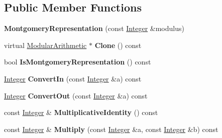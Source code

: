 \subsection*{Public Member Functions}
\begin{DoxyCompactItemize}
\item 
\hypertarget{class_montgomery_representation_ac65a390ac18c44b685a189047a4d3292}{
{\bfseries MontgomeryRepresentation} (const \hyperlink{class_integer}{Integer} \&modulus)}
\label{class_montgomery_representation_ac65a390ac18c44b685a189047a4d3292}

\item 
\hypertarget{class_montgomery_representation_a7a051242207625c219a03029365c4936}{
virtual \hyperlink{class_modular_arithmetic}{ModularArithmetic} $\ast$ {\bfseries Clone} () const }
\label{class_montgomery_representation_a7a051242207625c219a03029365c4936}

\item 
\hypertarget{class_montgomery_representation_a47ca2277410a94e93ab6aea778269047}{
bool {\bfseries IsMontgomeryRepresentation} () const }
\label{class_montgomery_representation_a47ca2277410a94e93ab6aea778269047}

\item 
\hypertarget{class_montgomery_representation_ac0a6608ef5bac036beb44d8cbd5eac52}{
\hyperlink{class_integer}{Integer} {\bfseries ConvertIn} (const \hyperlink{class_integer}{Integer} \&a) const }
\label{class_montgomery_representation_ac0a6608ef5bac036beb44d8cbd5eac52}

\item 
\hypertarget{class_montgomery_representation_ad0037be677cdac1fa22375a8619abc77}{
\hyperlink{class_integer}{Integer} {\bfseries ConvertOut} (const \hyperlink{class_integer}{Integer} \&a) const }
\label{class_montgomery_representation_ad0037be677cdac1fa22375a8619abc77}

\item 
\hypertarget{class_montgomery_representation_ac861eacde0adebc393da560f8b00fcf0}{
const \hyperlink{class_integer}{Integer} \& {\bfseries MultiplicativeIdentity} () const }
\label{class_montgomery_representation_ac861eacde0adebc393da560f8b00fcf0}

\item 
\hypertarget{class_montgomery_representation_a5414146384e2ce1aaad99edb3ef2947d}{
const \hyperlink{class_integer}{Integer} \& {\bfseries Multiply} (const \hyperlink{class_integer}{Integer} \&a, const \hyperlink{class_integer}{Integer} \&b) const }
\label{class_montgomery_representation_a5414146384e2ce1aaad99edb3ef2947d}


\end{DoxyCompactItemize}
